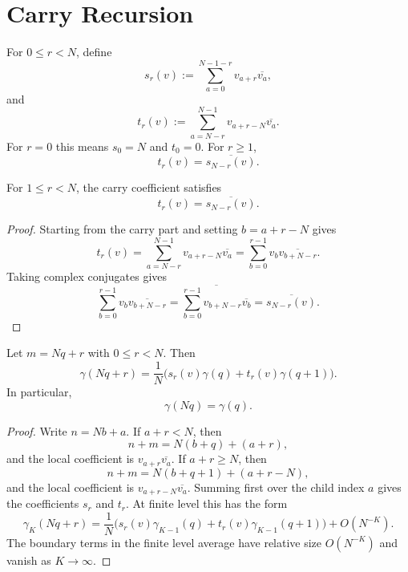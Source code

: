 \section{Carry Recursion}
\label{sec:innovation-input-correlation-carry-recursion}

\begin{definition}
\label{def:innovation-input-word-level-correlation-coefficients}
For $0\le r<N$, define
$$
s_r(v)
:=
\sum_{a=0}^{N-1-r}v_{a+r}\overline{v_a},
$$
and
$$
t_r(v)
:=
\sum_{a=N-r}^{N-1}v_{a+r-N}\overline{v_a}.
$$
For $r=0$ this means $s_0=N$ and $t_0=0$. For $r\ge1$,
$$
t_r(v)=\overline{s_{N-r}(v)}.
$$
\end{definition}

\begin{lemma}
\label{lem:innovation-input-carry-complement-identity}
For $1\le r<N$, the carry coefficient satisfies
$$
t_r(v)=\overline{s_{N-r}(v)}.
$$
\end{lemma}

\begin{proof}
Starting from the carry part and setting $b=a+r-N$ gives
$$
t_r(v)
=
\sum_{a=N-r}^{N-1}v_{a+r-N}\overline{v_a}
=
\sum_{b=0}^{r-1}v_b\overline{v_{b+N-r}}.
$$
Taking complex conjugates gives
$$
\sum_{b=0}^{r-1}v_b\overline{v_{b+N-r}}
=
\overline{
\sum_{b=0}^{r-1}v_{b+N-r}\overline{v_b}
}
=
\overline{s_{N-r}(v)}.
$$
\end{proof}

\begin{theorem}
\label{thm:innovation-input-correlation-carry-recursion}
Let $m=Nq+r$ with $0\le r<N$. Then
$$
\gamma(Nq+r)
=
\frac1N
\bigl(
s_r(v)\gamma(q)+t_r(v)\gamma(q+1)
\bigr).
$$
In particular,
$$
\gamma(Nq)=\gamma(q).
$$
\end{theorem}

\begin{proof}
Write $n=Nb+a$. If $a+r<N$, then
$$
n+m=N(b+q)+(a+r),
$$
and the local coefficient is
$v_{a+r}\overline{v_a}$. If $a+r\ge N$, then
$$
n+m=N(b+q+1)+(a+r-N),
$$
and the local coefficient is
$v_{a+r-N}\overline{v_a}$. Summing first over the child index $a$ gives
the coefficients $s_r$ and $t_r$. At finite level this has the form
$$
\gamma_K(Nq+r)
=
\frac1N
\bigl(
s_r(v)\gamma_{K-1}(q)+t_r(v)\gamma_{K-1}(q+1)
\bigr)
+
O(N^{-K}).
$$
The boundary terms in the finite level average have relative size
$O(N^{-K})$ and vanish as
$K\to\infty$.
\end{proof}

